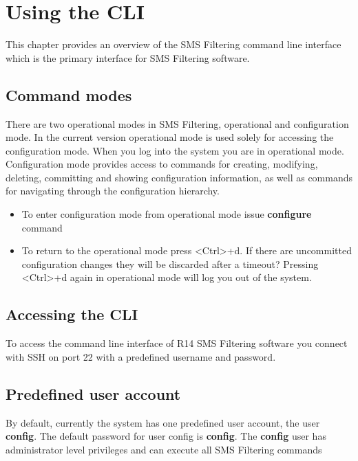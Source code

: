 \documentclass[a4paper,latin]{paper}
\begin{document}
\section{Using the CLI}

This chapter provides an overview of the SMS Filtering command line interface which is the
primary interface for SMS Filtering software.

\subsection{Command modes}

There are two operational modes in SMS Filtering, operational and configuration mode. In the
current version operational mode is used solely for accessing the configuration mode. When
you log into the system you are in operational mode.
Configuration mode provides access to commands for creating, modifying, deleting,
committing and showing configuration information, as well as commands for navigating
through the configuration hierarchy.

\begin{itemize}
	\item To enter configuration mode from operational mode issue \textbf{configure} command
	\item To return to the operational mode press \textless{}Ctrl\textgreater{}+d. If there are uncommitted
	      configuration changes they will be discarded after a timeout? Pressing \textless{}Ctrl\textgreater{}+d again
	      in operational mode will log you out of the system.
\end{itemize}

\subsection{Accessing the CLI}

To access the command line interface of R14 SMS Filtering software you connect with SSH on port 22
with a predefined username and password.

\subsection{Predefined user account}

By default, currently the system has one predefined user account, the user \textbf{config}. The default
password for user config is \textbf{config}. The \textbf{config} user has administrator level privileges and can execute
all SMS Filtering commands
\end{document}
